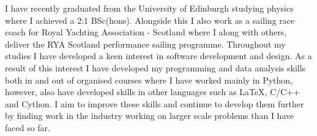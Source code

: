 

\begin{cvparagraph}
I have recently graduated from the University of Edinburgh studying physics where I achieved a 2:1 BSc(hons). Alongside this I also work as a sailing race coach for Royal Yachting Association - Scotland where I along with others, deliver the RYA Scotland performance sailing programme. Throughout my studies I have developed a keen interest in software development and design. As a result of this interest I have developed my programming and data analysis skills both in and out of organised courses where I have worked mainly in Python, however, also have developed skills in other languages such as LaTeX, C/C++ and Cython. I aim to improve these skills and continue to develop them further by finding work in the industry working on larger scale problems than I have faced so far.  

\end{cvparagraph}
